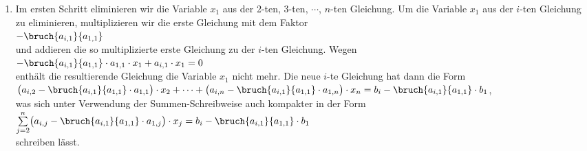 \begin{enumerate}
\item Im ersten Schritt eliminieren wir die Variable $x_1$ aus der 2-ten, 3-ten, $\cdots$, $n$-ten
      Gleichung.  Um die Variable $x_1$ aus der $i$-ten Gleichung zu eliminieren, multiplizieren 
      wir die erste Gleichung mit dem Faktor
      \\[0.2cm]
      \hspace*{1.3cm}
      $-\bruch{a_{i,1}}{a_{1,1}}$
      \\[0.2cm]
      und addieren die so multiplizierte erste Gleichung zu der $i$-ten Gleichung.  Wegen
      \\[0.2cm]
      \hspace*{1.3cm}
      $-\bruch{a_{i,1}}{a_{1,1}} \cdot a_{1,1} \cdot x_1 + a_{i,1} \cdot x_1 = 0$
      \\[0.2cm]
      enth\"{a}lt die resultierende Gleichung die Variable $x_1$ nicht mehr.  Die neue $i$-te Gleichung
      hat dann die Form
      \\[0.2cm]
      \hspace*{1.3cm}
      $\bigl(a_{i,2} - \bruch{a_{i,1}}{a_{1,1}} \cdot a_{1,1}\bigr) \cdot x_2 + \cdots + 
       \bigl(a_{i,n} - \bruch{a_{i,1}}{a_{1,1}} \cdot a_{1,n}\bigr) \cdot x_n =
       b_{i} - \bruch{a_{i,1}}{a_{1,1}} \cdot b_{1}
      $,
      \\[0.2cm]
      was sich unter Verwendung der Summen-Schreibweise auch kompakter in der Form
      \\[0.2cm]
      \hspace*{1.3cm}
      $\sum\limits_{j=2}^n \bigl(a_{i,j} - \bruch{a_{i,1}}{a_{1,1}} \cdot a_{1,j}\bigr) \cdot x_j =
       b_{i} - \bruch{a_{i,1}}{a_{1,1}} \cdot b_{1}
      $
      \\[0.2cm]
      schreiben l\"{a}sst.


\end{enumerate}
